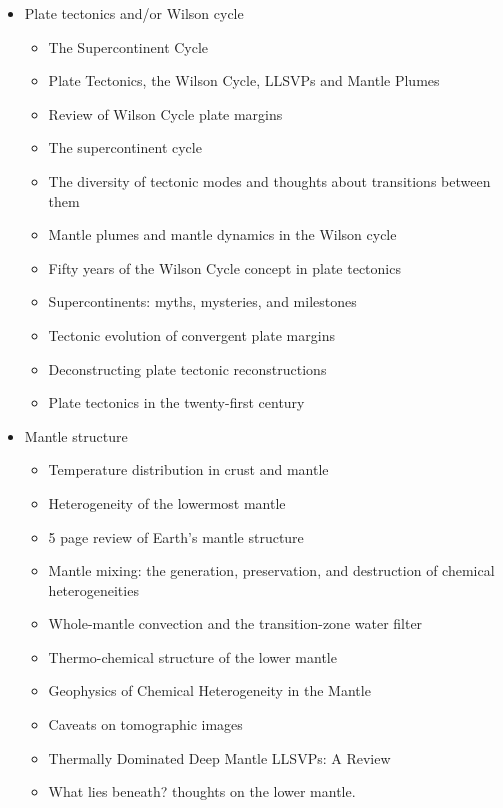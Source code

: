\begin{itemize}
\item Plate tectonics and/or Wilson cycle
   \begin{itemize}
   \item [\nineteeneightyeight] The Supercontinent Cycle \cite{nawm88}
   \item [\twothousandeleven] Plate Tectonics, the Wilson Cycle, LLSVPs and Mantle Plumes \cite{burk11}
   \item [\twothousandfourteen] Review of Wilson Cycle plate margins \cite{buto14}
   \item [\twothousandfourteen] The supercontinent cycle \cite{nams14}
   \item [\twothousandeighteen] The diversity of tectonic modes and thoughts about transitions between them \cite{lena18}
   \item [\twothousandnineteen] Mantle plumes and mantle dynamics in the Wilson cycle \cite{hero19}
   \item [\twothousandnineteen] Fifty years of the Wilson Cycle concept in plate tectonics \cite{wihb19}
   \item [\twothousandnineteen] Supercontinents: myths, mysteries, and milestones \cite{panm19}
   \item [\twothousandtwentytwo] Tectonic evolution of convergent plate margins \cite{zhcc22} 
   \item [\twothousandtwentythree] Deconstructing plate tectonic reconstructions \cite{sewd23}
   \item [\twothousandtwentythree] Plate tectonics in the twenty-first century \cite{zhen23}
   \end{itemize}

\item Mantle structure
   \begin{itemize}
   \item [\nineteeneightysix] Temperature distribution in crust and mantle \cite{jemo86}
   \item [\twothousand] Heterogeneity of the lowermost mantle \cite{garn00}
   \item [\twothousandone] 5 page review of Earth's mantle structure \cite{hewo01}
   \item [\twothousandtwo] Mantle mixing: the generation, preservation, and destruction of chemical heterogeneities \cite{vahb02}
   \item [\twothousandthree] Whole-mantle convection and the transition-zone water filter \cite{beka03}
   \item [\twothousandseven] Thermo-chemical structure of the lower mantle \cite{dett07}
   \item [\twothousandtwelve] Geophysics of Chemical Heterogeneity in the Mantle \cite{stli12}
   \item [\twothousandthirteen] Caveats on tomographic images \cite{fopa13}
   \item [\twothousandfifteen] Thermally Dominated Deep Mantle LLSVPs: A Review \cite{dagl15}
   \item [\twothousandnineteen] What lies beneath? thoughts on the lower mantle. \cite{hega19}
   \end{itemize}


\end{itemize}
